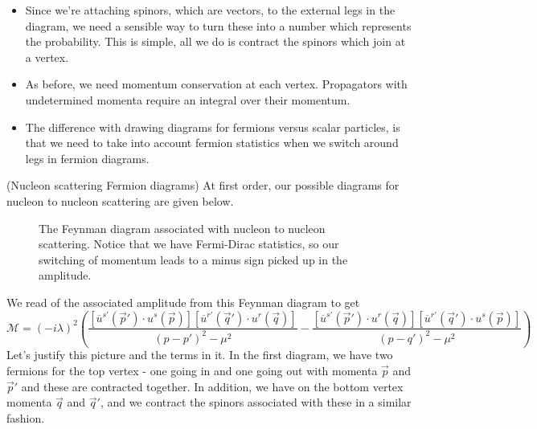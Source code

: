 \begin{itemize}
need to move consistently throughout the diagram. 
This reflects fermion number conservation.
\item Since we're attaching spinors, which are vectors, 
	to the external legs in the diagram, we need a sensible 
	way to turn these into a number which represents the probability. 
	This is simple, all we do is contract the spinors which 
	join at a vertex. 
\item As before, we need momentum conservation at each vertex. 
Propagators with undetermined momenta require an 
integral over their momentum. 
\item The difference with drawing diagrams 
for fermions versus scalar particles, is 
that we need to take into account fermion statistics when 
we switch around legs in fermion diagrams. 
\end{itemize} 

\begin{example}{(Nucleon scattering Fermion diagrams)} 
At first order, our possible diagrams 
for nucleon to nucleon scattering are given 
below. 
\begin{figure}[htpb]
\centering

\caption{The Feynman diagram associated with nucleon to nucleon scattering. 
Notice that we have Fermi-Dirac statistics, so our switching of momentum 
leads to a minus sign picked up in the amplitude. }%
\label{fig:}
\end{figure}
We read of the associated amplitude from this Feynman diagram 
to get 
\[
\mathcal{ M } = ( - i \lambda ) ^ 2 \left( 
\frac{\left[  \overline{ u } ^{ s' } ( \vec{p} ' ) \cdot  u ^ s ( \vec{p} )  \right] \left[ 
\overline{ u } ^{ r' } \left( \vec{q} '  \right)  \cdot  u ^ r (\vec{q} ) \right]  }{ \left( p - p '  \right)  ^ 2 - \mu ^ 2 } 
- \frac{ \left[  \overline{ u } ^{ s' } \left( \vec{p} ' \right)  \cdot  u ^ r ( \vec{q} )  \right] \left[ 
	 \overline{ u } ^{ r' } ( \vec{q} ') \cdot  u^{ s } ( \vec{p} )  \right]  }{  \left( p - q'  \right)  ^ 2 
- \mu ^ 2 }\right)  
\] 
Let's justify this 
picture and the terms in it. In the first diagram, 
we have two fermions for the top vertex - one going in and 
one going out with momenta $ \vec{p} $ and $ \vec{p} ' $ 
and these are contracted together. 
In addition, we have on the bottom vertex 
momenta $ \vec{q} $ and  $ \vec{q} ' $, and 
we contract the spinors associated with these in a similar fashion. 
\end{example}


